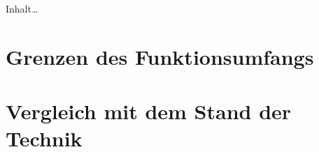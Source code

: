 
Inhalt\ldots

\section{Grenzen des Funktionsumfangs}


\section{Vergleich mit dem Stand der Technik}
